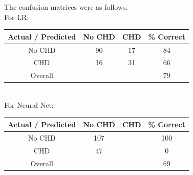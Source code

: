 \documentclass{article}
\begin{document}
The confusion matrices were as follows.\\
For LR:\\
\newline
\begin{tabular}{| c || c | c | c |}
  \hline
  Actual / Predicted & No CHD & CHD & \% Correct \\
  \hline
  \hline
  No CHD             &     90 &  17 &         84 \\
  \hline
  CHD                &     16 &  31 &         66 \\
  \hline
  \hline
  Overall            &        &     &         79 \\
  \hline
\end{tabular}
%
%
\hfill\newline\hfill\\
For Neural Net:\\
\begin{tabular}{| c || c | c | c |}
  \hline
  Actual / Predicted & No CHD & CHD & \% Correct \\
  \hline
  \hline
  No CHD             &    107 &     &        100 \\
  \hline
  CHD                &     47 &     &          0 \\
  \hline
  \hline
  Overall            &        &     &         69 \\
  \hline
\end{tabular}
\end{document}

